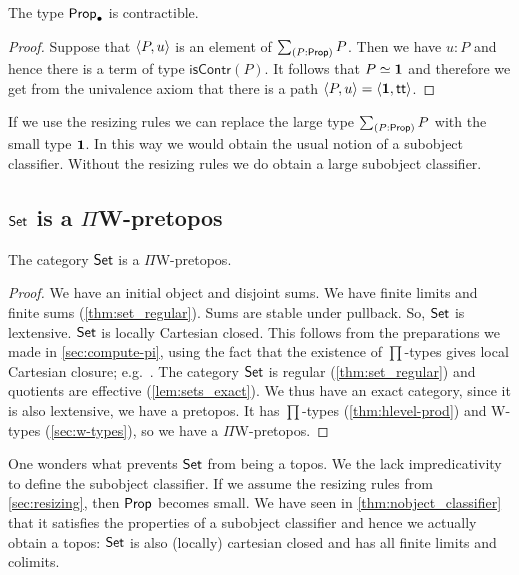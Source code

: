 \begin{lem}\label{lem:subobject}
The type $\mathsf{Prop}_\bullet$ is contractible.
\end{lem}
\begin{proof}
Suppose that ${\langle P,u\rangle}$ is an element of $\sm{P:\prop} P$. Then we have $u:P$ and hence there is a term of type $\mathsf{isContr}(P)$. It
follows that $P\simeq\mathbf{1}$ and therefore we get from the univalence axiom that there is a path
${\langle P,u\rangle}={\langle \mathbf{1},\mathsf{tt}\rangle}$.
\end{proof}

If we use the resizing rules we can replace the large type $\sm{P:\prop} P$ with the small type $\mathbf{1}$. In this way we would obtain
the usual notion of a subobject classifier. Without the resizing rules we do obtain a large subobject classifier.

\subsection{\texorpdfstring{$\mathsf{Set}$}{Set} is a \texorpdfstring{$\Pi$}{Π}W-pretopos}
\label{subsec:piw}
\begin{thm} The category $\mathsf{Set}$ is a $\Pi$W-pretopos.
\end{thm}
\begin{proof}
We have an initial object and disjoint sums. We have finite limits and finite sums (\autoref{thm:set_regular}). 
Sums are stable under pullback. So, $\mathsf{Set}$ is lextensive. 
$\mathsf{Set}$ is locally Cartesian closed. This follows from the preparations we made in
\autoref{sec:compute-pi}, using the
fact that the existence of $\prod$-types gives local Cartesian closure; e.g.~\citep[Prop.~1.9.8]{jacobs1999categorical}.
The category $\mathsf{Set}$ is regular (\autoref{thm:set_regular}) and quotients are effective (\autoref{lem:sets_exact}). We thus have an
exact category, since it is also lextensive, we have a pretopos. It has $\prod$-types (\autoref{thm:hlevel-prod}) and
W-types
(\autoref{sec:w-types}), so we have a $\Pi$W-pretopos. 
\end{proof}

One wonders what prevents $\mathsf{Set}$ from being a topos. We the lack impredicativity to define the subobject classifier. If we
assume the resizing rules from \autoref{sec:resizing}, then $\mathsf{Prop}$ becomes small. We have seen in
\autoref{thm:nobject_classifier} that it satisfies the properties of a subobject classifier and hence we actually
obtain a topos: $\mathsf{Set}$ is also (locally) cartesian closed and has all finite limits and colimits.

